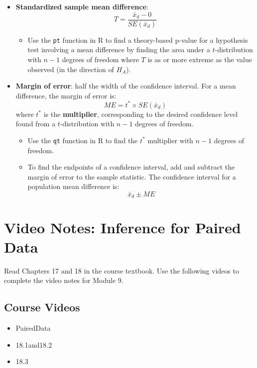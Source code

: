 \documentclass[
]{report}
\providecommand{\tightlist}{%
  \setlength{\itemsep}{0pt}\setlength{\parskip}{0pt}}
\begin{document}
\begin{itemize}
\item
  \textbf{Standardized sample mean difference}:
  \[T = \frac{\bar{x}_d-0}{SE(\bar{x}_d)}\]

  \begin{itemize}
  \tightlist
  \item
    Use the \texttt{pt} function in R to find a theory-based p-value for a hypothesis test involving a mean difference by finding the area under a \(t\)-distribution with \(n-1\) degrees of freedom where \(T\) is as or more extreme as the value observed (in the direction of \(H_A\)).
  \end{itemize}
\item
  \textbf{Margin of error}: half the width of the confidence interval. For a mean difference, the margin of error is:
  \[ME = t^* \times SE(\bar{x}_d)\]
  where \(t^*\) is the \textbf{multiplier}, corresponding to the desired confidence level found from a \(t\)-distribution with \(n-1\) degrees of freedom.

  \begin{itemize}
  \item
    Use the \texttt{qt} function in R to find the \(t^*\) multiplier with \(n-1\) degrees of freedom.
  \item
    To find the endpoints of a confidence interval, add and subtract the margin of error to the sample statistic. The confidence interval for a population mean difference is:
    \[\bar{x}_d \pm ME\]
  \end{itemize}
\end{itemize}

\newpage

\section{Video Notes: Inference for Paired Data}\label{video-notes-inference-for-paired-data}

Read Chapters 17 and 18 in the course textbook. Use the following videos to complete the video notes for Module 9.

\subsection{Course Videos}\label{course-videos-8}

\begin{itemize}
\item
  PairedData
\item
  18.1and18.2
\item
  18.3
\end{itemize}
\end{document}
